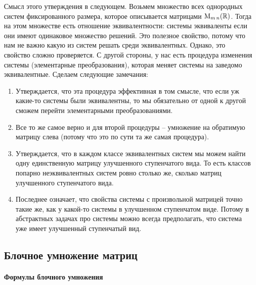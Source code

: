 Смысл этого утверждения в следующем. Возьмем множество всех однородных систем фиксированного размера, которое описывается матрицами $\operatorname{M}_{m\,n}(\mathbb R)$. Тогда на этом множестве есть отношение эквивалентности: системы эквиваленты если они имеют одинаковое множество решений. Это полезное свойство, потому что нам не важно какую из систем решать среди эквивалентных. Однако, это свойство сложно проверяется. С другой стороны, у нас есть процедура изменения системы (элементарные преобразования), которая меняет системы на заведомо эквивалентные. Сделаем следующие замечания:
\begin{enumerate}
\item Утверждается, что эта процедура эффективная в том смысле, что если уж какие-то системы были эквивалентны, то мы обязательно от одной к другой сможем перейти элементарными преобразованиями. 

\item Все то же самое верно и для второй процедуры -- умножение на обратимую матрицу слева (потому что это по сути та же самая процедура).

\item Утверждается, что в каждом классе эквивалентных систем мы можем найти одну единственную матрицу улучшенного ступенчатого вида. То есть классов попарно неэквивалентных систем ровно столько же, сколько матриц улучшенного ступенчатого вида.

\item Последнее означает, что свойства системы с произвольной матрицей точно такие же, как у какой-то системы в улучшенном ступенчатом виде. Потому в абстрактных задачах про системы можно всегда предполагать, что система уже имеет улучшенный ступенчатый вид.
\end{enumerate}



\subsection{Блочное умножение матриц}
\paragraph{Формулы блочного умножения}

